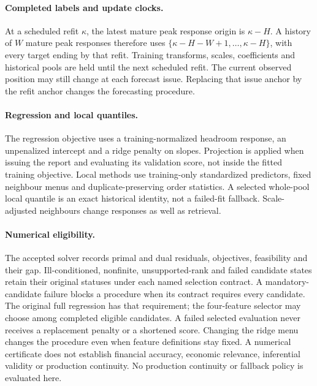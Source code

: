\documentclass[11pt,a4paper]{article}
\begin{document}
\paragraph{Completed labels and update clocks.}
At a scheduled refit \(\kappa\), the latest mature peak response origin is
\(\kappa-H\). A history of \(W\) mature peak responses therefore uses
\(\{\kappa-H-W+1,\ldots,\kappa-H\}\), with every target ending by that refit.
Training transforms, scales, coefficients and historical pools are held until
the next scheduled refit. The current observed position may still change at
each forecast issue. Replacing that issue anchor by the refit anchor changes
the forecasting procedure.

\paragraph{Regression and local quantiles.}
The regression objective uses a training-normalized headroom response, an
unpenalized intercept and a ridge penalty on slopes. Projection is applied when
issuing the report and evaluating its validation score, not inside the fitted
training objective. Local methods use training-only standardized predictors,
fixed neighbour menus and duplicate-preserving order statistics. A selected
whole-pool local quantile is an exact historical identity, not a failed-fit
fallback. Scale-adjusted neighbours change responses as well as retrieval.

\paragraph{Numerical eligibility.}
The accepted solver records primal and dual residuals, objectives, feasibility
and their gap. Ill-conditioned, nonfinite, unsupported-rank and failed candidate
states retain their original statuses under each named selection contract.
A mandatory-candidate failure blocks a procedure when its contract requires
every candidate. The original full regression has that requirement; the
four-feature selector may choose among completed eligible candidates. A failed
selected evaluation never receives a replacement penalty or a shortened score.
Changing the ridge menu changes the procedure even when feature definitions
stay fixed. A numerical certificate does not establish financial accuracy,
economic relevance, inferential validity or production continuity.
No production continuity or fallback policy is evaluated here.
\end{document}
